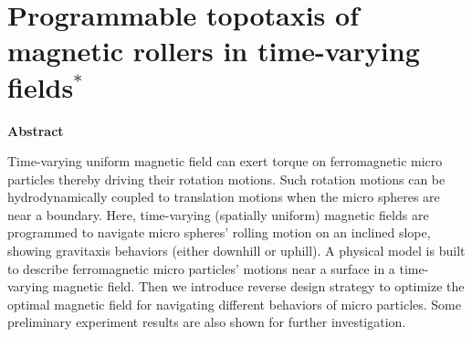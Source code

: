 
\chapter{Programmable topotaxis of magnetic rollers in time-varying  fields$^{*}$}


\begin{center}
\vspace*{1\baselineskip}
\textbf{Abstract}
\end{center}
Time-varying uniform magnetic field can exert torque on ferromagnetic micro particles thereby driving their rotation motions. Such rotation motions can be hydrodynamically coupled to translation motions when the micro spheres are near a boundary. Here, time-varying (spatially uniform) magnetic fields are  programmed to navigate micro spheres' rolling motion on an inclined slope, showing gravitaxis behaviors (either downhill or uphill). A physical model is  built  to describe ferromagnetic micro particles' motions near a surface in a time-varying magnetic field. Then we introduce reverse design strategy to optimize the optimal magnetic field for navigating different behaviors of micro particles. Some preliminary experiment results are also shown for further investigation. 
 
